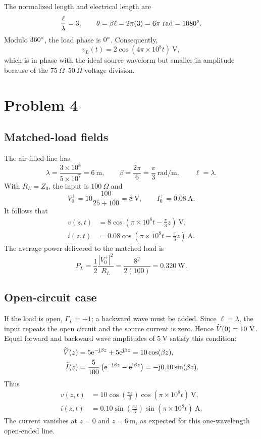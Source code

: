 \documentclass[12pt,a4paper]{article}
\begin{document}
The normalized length and electrical length are
\[
\frac{\ell}{\lambda}=3,
\qquad \theta=\beta\ell=2\pi(3)=6\pi~\mathrm{rad}=1080^{\circ}.
\]
Modulo $360^{\circ}$, the load phase is $0^{\circ}$.  Consequently,
\[
v_L(t)=2\cos(4\pi\times10^8t)~\mathrm{V},
\]
which is in phase with the ideal source waveform but smaller in amplitude
because of the $75~\Omega$--$50~\Omega$ voltage division.


\section{Problem 4}


\subsection{Matched-load fields}

The air-filled line has
\[
\lambda=\frac{3\times10^8}{5\times10^7}=6~\mathrm{m},
\qquad
\beta=\frac{2\pi}{6}=\frac{\pi}{3}~\mathrm{rad/m},
\qquad
\ell=\lambda.
\]
With $R_L=Z_0$, the input is $100~\Omega$ and
\[
V_0^+=10\frac{100}{25+100}=8~\mathrm{V},
\qquad I_0^+=0.08~\mathrm{A}.
\]
It follows that
\begin{align}
v(z,t)&=8\cos\left(\pi\times10^8t-\frac{\pi}{3}z\right)~\mathrm{V},\\
i(z,t)&=0.08\cos\left(\pi\times10^8t-\frac{\pi}{3}z\right)~\mathrm{A}.
\end{align}
The average power delivered to the matched load is
\begin{equation}
P_L=\frac{1}{2}\frac{|V_0^+|^2}{R_L}
=\frac{8^2}{2(100)}=0.320~\mathrm{W}.
\end{equation}

\subsection{Open-circuit case}

If the load is open, $\Gamma_L=+1$; a backward wave must be added.  Since
$\ell=\lambda$, the input repeats the open circuit and the source current is
zero.  Hence $\widetilde{V}(0)=10~\mathrm{V}$.  Equal forward and backward wave
amplitudes of $5~\mathrm{V}$ satisfy this condition:
\begin{align}
\widetilde{V}(z)&=5\mathrm{e}^{-\mathrm{j}\beta z}+5\mathrm{e}^{\mathrm{j}\beta z}
=10\cos(\beta z),\\
\widetilde{I}(z)&=\frac{5}{100}\left(\mathrm{e}^{-\mathrm{j}\beta z}
-\mathrm{e}^{\mathrm{j}\beta z}\right)=-\mathrm{j}0.10\sin(\beta z).
\end{align}
Thus
\begin{align}
v(z,t)&=10\cos\left(\frac{\pi z}{3}\right)
\cos(\pi\times10^8t)~\mathrm{V},\\
i(z,t)&=0.10\sin\left(\frac{\pi z}{3}\right)
\sin(\pi\times10^8t)~\mathrm{A}.
\end{align}
The current vanishes at $z=0$ and $z=6~\mathrm{m}$, as expected for this
one-wavelength open-ended line.
\end{document}
